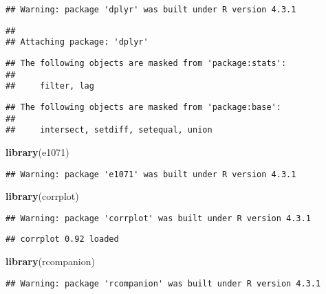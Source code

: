 \documentclass[
]{article}
\newenvironment{Shaded}{\begin{snugshade}}{\end{snugshade}}
\newcommand{\FunctionTok}[1]{\textcolor[rgb]{0.13,0.29,0.53}{\textbf{#1}}}
\newcommand{\NormalTok}[1]{#1}
\begin{document}
\begin{verbatim}
## Warning: package 'dplyr' was built under R version 4.3.1
\end{verbatim}

\begin{verbatim}
## 
## Attaching package: 'dplyr'
\end{verbatim}

\begin{verbatim}
## The following objects are masked from 'package:stats':
## 
##     filter, lag
\end{verbatim}

\begin{verbatim}
## The following objects are masked from 'package:base':
## 
##     intersect, setdiff, setequal, union
\end{verbatim}

\begin{Shaded}
\begin{Highlighting}[]
\FunctionTok{library}\NormalTok{(e1071)}
\end{Highlighting}
\end{Shaded}

\begin{verbatim}
## Warning: package 'e1071' was built under R version 4.3.1
\end{verbatim}

\begin{Shaded}
\begin{Highlighting}[]
\FunctionTok{library}\NormalTok{(corrplot)}
\end{Highlighting}
\end{Shaded}

\begin{verbatim}
## Warning: package 'corrplot' was built under R version 4.3.1
\end{verbatim}

\begin{verbatim}
## corrplot 0.92 loaded
\end{verbatim}

\begin{Shaded}
\begin{Highlighting}[]
\FunctionTok{library}\NormalTok{(rcompanion)}
\end{Highlighting}
\end{Shaded}

\begin{verbatim}
## Warning: package 'rcompanion' was built under R version 4.3.1
\end{verbatim}
\end{document}
